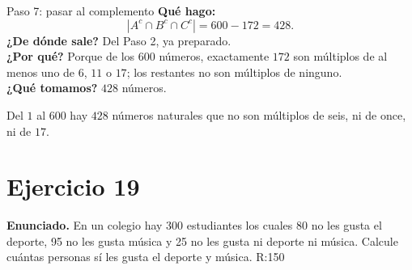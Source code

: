\documentclass[11pt]{article}
\begin{document}
\begin{sol}
\begin{paso}{Paso 7: pasar al complemento}
\textbf{Qu\'e hago:}
\[
|A^{c}\cap B^{c}\cap C^{c}| = 600 - 172 = 428 .
\]
\textbf{¿De d\'onde sale?} Del Paso 2, ya preparado.\\
\textbf{¿Por qu\'e?} Porque de los $600$ n\'umeros, exactamente $172$ son m\'ultiplos de al menos uno de $6$, $11$ o $17$; los restantes no son m\'ultiplos de ninguno.\\
\textbf{¿Qu\'e tomamos?} $428$ n\'umeros.
\end{paso}

\end{sol}

\begin{resp}
Del $1$ al $600$ hay $\boxed{428}$ n\'umeros naturales que no son m\'ultiplos de seis, ni de once, ni de $17$.
\end{resp}

\newpage

\section*{Ejercicio 19}

\textbf{Enunciado.} En un colegio hay 300 estudiantes los cuales 80 no les gusta el deporte, 95 no les gusta m\'usica y 25 no les gusta ni deporte ni m\'usica. Calcule cu\'antas personas s\'i les gusta el deporte y m\'usica. R:150
\end{document}
